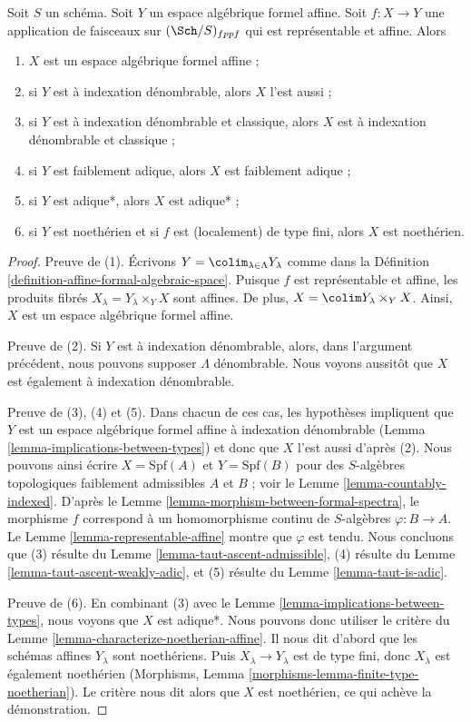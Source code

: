 \begin{lemma}
\label{lemma-property-goes-up-affine-morphism}
Soit $S$ un schéma. Soit $Y$ un espace algébrique formel affine.
Soit $f : X \to Y$ une application de faisceaux sur $(\Sch/S)_{fppf}$ qui
est représentable et affine. Alors
\begin{enumerate}
\item $X$ est un espace algébrique formel affine ;
\item si $Y$ est à indexation dénombrable, alors $X$ l'est aussi ;
\item si $Y$ est à indexation dénombrable et classique, alors $X$ est
à indexation dénombrable et classique ;
\item si $Y$ est faiblement adique, alors $X$ est faiblement adique ;
\item si $Y$ est adique*, alors $X$ est adique* ;
\item si $Y$ est noethérien et si $f$ est (localement) de type fini, alors
$X$ est noethérien.
\end{enumerate}
\end{lemma}

\begin{proof}
Preuve de (1). Écrivons $Y = \colim_{\lambda \in \Lambda} Y_\lambda$ comme dans la
Définition \ref{definition-affine-formal-algebraic-space}.
Puisque $f$ est représentable et affine, les produits fibrés
$X_\lambda = Y_\lambda \times_Y X$ sont affines. De plus,
$X = \colim Y_\lambda \times_Y X$.
Ainsi, $X$ est un espace algébrique formel affine.

\medskip\noindent
Preuve de (2). Si $Y$ est à indexation dénombrable, alors, dans l'argument précédent,
nous pouvons supposer $\Lambda$ dénombrable.
Nous voyons aussitôt que $X$ est également à indexation dénombrable.

\medskip\noindent
Preuve de (3), (4) et (5). Dans chacun de ces cas, les hypothèses impliquent
que $Y$ est un espace algébrique formel affine à indexation dénombrable
(Lemma \ref{lemma-implications-between-types})
et donc que $X$ l'est aussi d'après (2). Nous pouvons ainsi écrire $X = \text{Spf}(A)$
et $Y = \text{Spf}(B)$ pour des $S$-algèbres topologiques faiblement
admissibles $A$ et $B$ ; voir le Lemme \ref{lemma-countably-indexed}.
D'après le Lemme \ref{lemma-morphism-between-formal-spectra},
le morphisme $f$ correspond à un homomorphisme continu de $S$-algèbres
$\varphi : B \to A$. Le
Lemme \ref{lemma-representable-affine} montre que $\varphi$ est tendu. Nous concluons que
(3) résulte du Lemme \ref{lemma-taut-ascent-admissible},
(4) résulte du Lemme \ref{lemma-taut-ascent-weakly-adic}, et
(5) résulte du Lemme \ref{lemma-taut-is-adic}.

\medskip\noindent
Preuve de (6). En combinant (3) avec le Lemme \ref{lemma-implications-between-types},
nous voyons que $X$ est adique*. Nous pouvons donc utiliser le critère du
Lemme \ref{lemma-characterize-noetherian-affine}.
Il nous dit d'abord que les schémas affines $Y_\lambda$ sont noethériens.
Puis $X_\lambda \to Y_\lambda$ est de type fini, donc $X_\lambda$
est également noethérien (Morphisms, Lemma
\ref{morphisms-lemma-finite-type-noetherian}).
Le critère nous dit alors que $X$ est noethérien, ce qui achève la
démonstration.
\end{proof}

